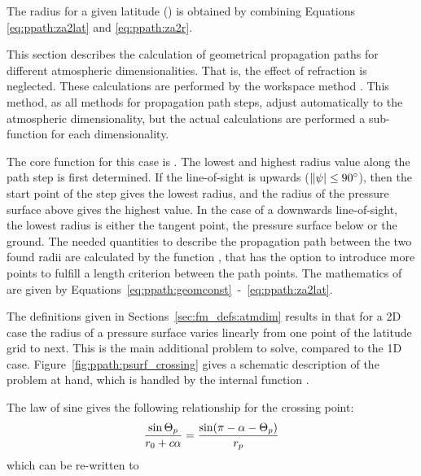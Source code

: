 The radius for a given latitude ()
is obtained by combining Equations \ref{eq:ppath:za2lat} and
\ref{eq:ppath:za2r}.



\label{sec:ppath:stepcalc}

This section describes the calculation of geometrical propagation
paths for different atmospheric dimensionalities. That is, the effect
of refraction is neglected. These calculations are performed by the
workspace method . This method, as all
methods for propagation path steps, adjust automatically to the
atmospheric dimensionality, but the actual calculations are performed
a sub-function for each dimensionality.


\label{sec:ppath:1Dgeom}

The core function for this case is . The
lowest and highest radius value along the path step is first
determined. If the line-of-sight is upwards ($\|\psi| \leq
90^\circ$), then the start point of the step gives the lowest radius,
and the radius of the pressure surface above gives the highest value.
In the case of a downwards line-of-sight, the lowest radius is either
the tangent point, the pressure surface below or the ground. The
needed quantities to describe the propagation path between the two
found radii are calculated by the function
, that has the option to
introduce more points to fulfill a length criterion between the path
points. The mathematics of  are
given by Equations~\ref{eq:ppath:geomconst}~-~\ref{eq:ppath:za2lat}.


\label{sec:ppath:2Dgeom}

The definitions given in Sections~\ref{sec:fm_defs:atmdim} results in
that for a 2D case the radius of a pressure surface varies linearly
from one point of the latitude grid to next. This is the main
additional problem to solve, compared to the 1D case.
Figure~\ref{fig:ppath:psurf_crossing} gives a schematic description of
the problem at hand, which is handled by the internal function
.

The law of sine gives the following relationship for the crossing
point:
\begin{equation}
  \frac{\sin\Theta_p}{r_{0}+c\alpha} = 
                                \frac{\sin(\pi-\alpha-\Theta_p)}{r_{p}}
\end{equation}
which can be re-written to

